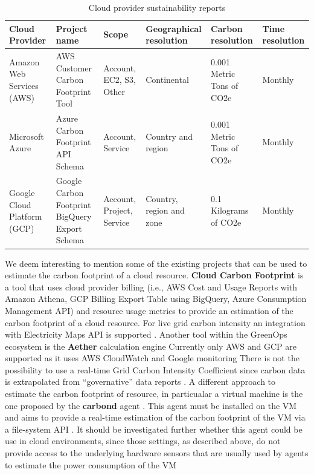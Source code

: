 \begin{table}[t]
  \centering
  \renewcommand{\arraystretch}{1.2} %
  \setlength{\extrarowheight}{2pt} %
  \begin{tabularx}{\textwidth}{|X|X|X|X|X|X|}
  \hline
  \textbf{Cloud Provider}     & \textbf{Project name}                          & \textbf{Scope}            & \textbf{Geographical resolution} & \textbf{Carbon resolution} & \textbf{Time resolution} \\ \hline
  Amazon Web Services (AWS)   & AWS Customer Carbon Footprint Tool             & Account, EC2, S3, Other   & Continental                      & 0.001 Metric Tons of CO2e  & Monthly                  \\ \hline
  Microsoft Azure             & Azure Carbon Footprint API Schema              & Account, Service          & Country and region               & 0.001 Metric Tons of CO2e  & Monthly                  \\ \hline
  Google Cloud Platform (GCP) & Google Carbon Footprint BigQuery Export Schema & Account, Project, Service & Country, region and zone         & 0.1 Kilograms of CO2e      & Monthly                  \\ \hline
  \end{tabularx}
  \caption{Cloud provider sustainability reports}
  \label{tab:cloud_carbon_emissions_reports}
\end{table}

We deem interesting to mention some of the existing projects that can be used to estimate the carbon footprint of a cloud resource.
\textbf{Cloud Carbon Footprint} \cite{cloud_carbon_footprint} is a tool that uses cloud provider billing (i.e., AWS Cost and Usage Reports with Amazon Athena, GCP Billing Export Table using BigQuery, Azure Consumption Management API) and resource usage metrics to provide an estimation of the carbon footprint of a cloud resource. For live grid carbon intensity an integration with Electricity Maps API is supported \cite{cloud_carbon_footprint}.
Another tool within the GreenOps ecosystem is the \textbf{Aether} calculation engine \cite{aether}
Currently only AWS and GCP are supported as it uses AWS CloudWatch and Google monitoring
There is not the possibility to use a real-time Grid Carbon Intensity Coefficient since carbon data is extrapolated from “governative” data reports \cite{aether}.
A different approach to estimate the carbon footprint of resource, in particualar a virtual machine is the one proposed by the \textbf{carbond} agent \cite{carbond:2023:hotcarbon}. 
This agent must be installed on the VM and aims to provide a real-time estimation of the carbon footprint of the VM via a file-system API \cite{carbond:2023:hotcarbon}.
It should be investigated further whether this agent could be use in cloud environments, since those settings, as described above, do not provide access to the underlying hardware sensors that are usually used by agents to estimate the power consumption of the VM

